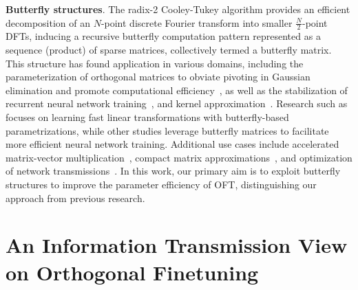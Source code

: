 \textbf{Butterfly structures}. The radix-2 Cooley-Tukey algorithm provides an efficient decomposition of an $N$-point discrete Fourier transform into smaller $\frac{N}{2}$-point DFTs, inducing a recursive butterfly computation pattern represented as a sequence (product) of sparse matrices, collectively termed a butterfly matrix. This structure has found application in various domains, including the parameterization of orthogonal matrices to obviate pivoting in Gaussian elimination and promote computational efficiency~\cite{parker1995random}, as well as the stabilization of recurrent neural network training~\cite{jing2017tunable}, and kernel approximation~\cite{munkhoeva2018quadrature}. Research such as \cite{dao2019learning,dao2019kaleidoscope} focuses on learning fast linear transformations with butterfly-based parametrizations, while other studies \cite{chen2022pixelated,dao2022monarch} leverage butterfly matrices to facilitate more efficient neural network training. Additional use cases include accelerated matrix-vector multiplication~\cite{michielssen1996multilevel,o2010algorithm}, compact matrix approximations~\cite{li2015butterfly}, and optimization of network transmissions~\cite{klasing1994broadcasting,li2003linear,rajasingh2016transmission}. In this work, our primary aim is to exploit butterfly structures to improve the parameter efficiency of OFT, distinguishing our approach from previous research.

\section{An Information Transmission View on Orthogonal Finetuning}

